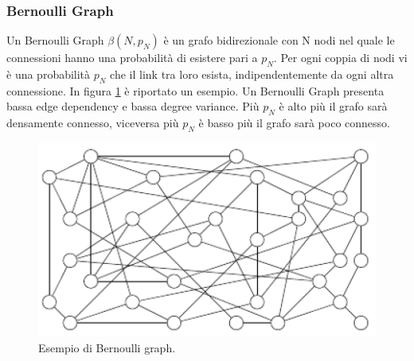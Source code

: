 \subsubsection{Bernoulli Graph}
Un Bernoulli Graph $\beta \mathit{\left( N,p_N \right)}$ è un grafo bidirezionale con N nodi nel quale le connessioni hanno una probabilità di esistere pari a $\mathit{p_N}$. Per ogni coppia di nodi vi è una probabilità $\mathit{p_N}$ che il link tra loro esista, indipendentemente da ogni altra connessione. In figura \ref{fig:bernoulli_graph} è riportato un esempio. Un Bernoulli Graph presenta bassa edge dependency e bassa degree variance. Più $\mathit{p_N}$ è alto più il grafo sarà densamente connesso, viceversa più $\mathit{p_N}$ è basso più il grafo sarà poco connesso.
\bigskip
\begin{figure}[h]
	\centering
	\includegraphics[width=0.7\linewidth,keepaspectratio]{Images/reti/bernoulli_graph}
	\caption[Bernoulli graph]{Esempio di Bernoulli graph\cite{comparisonGAonRT2014-ita}.}
	\label{fig:bernoulli_graph}
\end{figure}
\bigskip


